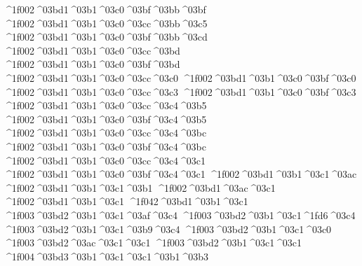 {^^^^1f002^^^^03bd1^^^^03b1^^^^03c0^^^^03bf^^^^03bb^^^^03bf
^^^^1f002^^^^03bd1^^^^03b1^^^^03c0^^^^03cc^^^^03bb^^^^03c5 		%
^^^^1f002^^^^03bd1^^^^03b1^^^^03c0^^^^03bf^^^^03bb^^^^03cd
^^^^1f002^^^^03bd1^^^^03b1^^^^03c0^^^^03cc^^^^03bd		%
^^^^1f002^^^^03bd1^^^^03b1^^^^03c0^^^^03bf^^^^03bd
^^^^1f002^^^^03bd1^^^^03b1^^^^03c0^^^^03cc^^^^03c0 		%
^^^^1f002^^^^03bd1^^^^03b1^^^^03c0^^^^03bf^^^^03c0 
^^^^1f002^^^^03bd1^^^^03b1^^^^03c0^^^^03cc^^^^03c3 		%
^^^^1f002^^^^03bd1^^^^03b1^^^^03c0^^^^03bf^^^^03c3
^^^^1f002^^^^03bd1^^^^03b1^^^^03c0^^^^03cc^^^^03c4^^^^03b5 		%
^^^^1f002^^^^03bd1^^^^03b1^^^^03c0^^^^03bf^^^^03c4^^^^03b5
^^^^1f002^^^^03bd1^^^^03b1^^^^03c0^^^^03cc^^^^03c4^^^^03bc 		%
^^^^1f002^^^^03bd1^^^^03b1^^^^03c0^^^^03bf^^^^03c4^^^^03bc
^^^^1f002^^^^03bd1^^^^03b1^^^^03c0^^^^03cc^^^^03c4^^^^03c1 		%
^^^^1f002^^^^03bd1^^^^03b1^^^^03c0^^^^03bf^^^^03c4^^^^03c1
^^^^1f002^^^^03bd1^^^^03b1^^^^03c1^^^^03ac 		%
^^^^1f002^^^^03bd1^^^^03b1^^^^03c1^^^^03b1
^^^^1f002^^^^03bd1^^^^03ac^^^^03c1    		%
^^^^1f002^^^^03bd1^^^^03b1^^^^03c1
^^^^1f042^^^^03bd1^^^^03b1^^^^03c1     		%
	^^^^1f003^^^^03bd2^^^^03b1^^^^03c1^^^^03af^^^^03c4		%
	^^^^1f003^^^^03bd2^^^^03b1^^^^03c1^^^^1fd6^^^^03c4		%
	^^^^1f003^^^^03bd2^^^^03b1^^^^03c1^^^^03b9^^^^03c4		%
	^^^^1f003^^^^03bd2^^^^03b1^^^^03c1^^^^03c0		%
	^^^^1f003^^^^03bd2^^^^03ac^^^^03c1^^^^03c1 		%
	^^^^1f003^^^^03bd2^^^^03b1^^^^03c1^^^^03c1  		
		^^^^1f004^^^^03bd3^^^^03b1^^^^03c1^^^^03c1^^^^03b1^^^^03b3 		%
}
